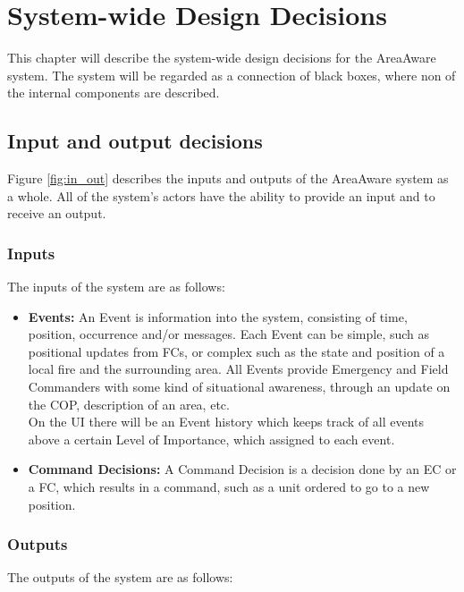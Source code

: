 \chapter{System-wide Design Decisions}
\label{chp:system-wide}

This chapter will describe the system-wide design decisions for the AreaAware system. The system will be regarded as a connection of black boxes, where non of the internal components are described.

\section{Input and output decisions}
Figure \ref{fig:in_out} describes the inputs and outputs of the AreaAware system as a whole. All of the system's actors have the ability to provide an input and to receive an output.\\


\pagebreak

\subsection{Inputs}
The inputs of the system are as follows:

\begin{itemize}
	\item \textbf{Events:} An Event is information into the system, consisting of time, position, occurrence and/or messages. Each Event can be simple, such as positional updates from FCs, or complex such as the state and position of a local fire and the surrounding area. All Events provide Emergency and Field Commanders with some kind of situational awareness, through an update on the COP, description of an area, etc. \\
	On the UI there will be an Event history which keeps track of all events above a certain Level of Importance, which assigned to each event.
	\item \textbf{Command Decisions:} A Command Decision is a decision done by an EC or a FC, which results in a command, such as a unit ordered to go to a new position.
\end{itemize}

\subsection{Outputs}
The outputs of the system are as follows:

